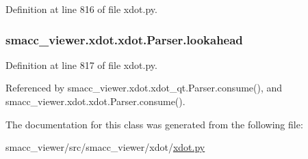 Definition at line 816 of file xdot.\+py.

\subsubsection[{\texorpdfstring{lookahead}{lookahead}}]{\setlength{\rightskip}{0pt plus 5cm}smacc\+\_\+viewer.\+xdot.\+xdot.\+Parser.\+lookahead}\hypertarget{classsmacc__viewer_1_1xdot_1_1xdot_1_1Parser_a02653f25a9384c30c847454e361ebad8}{}\label{classsmacc__viewer_1_1xdot_1_1xdot_1_1Parser_a02653f25a9384c30c847454e361ebad8}


Definition at line 817 of file xdot.\+py.



Referenced by smacc\+\_\+viewer.\+xdot.\+xdot\+\_\+qt.\+Parser.\+consume(), and smacc\+\_\+viewer.\+xdot.\+xdot.\+Parser.\+consume().



The documentation for this class was generated from the following file\+:\begin{DoxyCompactItemize}
\item 
smacc\+\_\+viewer/src/smacc\+\_\+viewer/xdot/\hyperlink{xdot_8py}{xdot.\+py}\end{DoxyCompactItemize}
